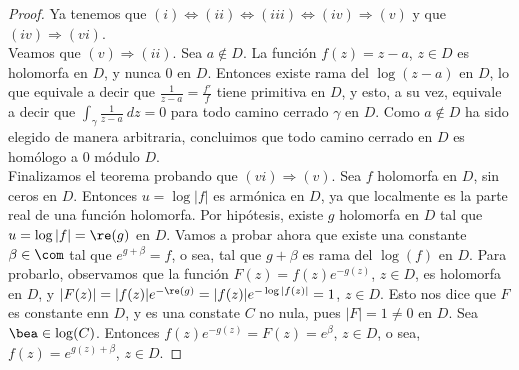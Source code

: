 \begin{proof}
Ya tenemos que $(i) \Longleftrightarrow (ii) \Longleftrightarrow (iii) \Longleftrightarrow (iv) \Longrightarrow (v)$ y que $(iv) \Longrightarrow (vi)$.
\\
\newline
 Veamos que $(v) \Longrightarrow (ii)$. Sea $a \not \in D$. La función $f(z) = z-a$, $z \in D$ es holomorfa en $D$, y nunca 0 en $D$. Entonces existe rama del $\log(z-a)$ en $D$, lo que equivale a decir que $\frac{1}{z-a} = \frac{f'}{f}$ tiene primitiva en $D$, y esto, a su vez, equivale a decir que $\int_{\gamma} \frac{1}{z-a} \ dz = 0$ para todo camino cerrado $\gamma$ en $D$. Como $a \not \in D$ ha sido elegido de manera arbitraria, concluimos que todo camino cerrado en $D$ es homólogo a 0 módulo $D$.
\\
\newline
Finalizamos el teorema probando que $(vi) \Longrightarrow (v)$. Sea $f$ holomorfa en $D$, sin ceros en $D$. Entonces $u = \log |f|$ es armónica en $D$, ya que localmente es la parte real de una función holomorfa. Por hipótesis, existe $g$ holomorfa en $D$ tal que $u = \log|f| = \re(g)$ en $D$. Vamos a probar ahora que existe una constante $\beta \in \com$ tal que $e^{g + \beta} = f$, o sea, tal que $g + \beta$ es rama del $\log(f)$ en $D$. Para probarlo, observamos que la función $F(z) = f(z)e^{-g(z)}$, $z \in D$, es holomorfa en $D$, y $|F(z)| = |f(z)|e^{-\re(g)} = |f(z)|e^{-\log|f(z)|} = 1$, $z \in D$. Esto nos dice que $F$ es constante enn $D$, y es una constate $C$ no nula, pues $|F| = 1 \not = 0$ en $D$. Sea $\bea \in \log(C)$. Entonces $f(z)e^{-g(z)} = F(z) = e^{\beta}$, $z \in D$, o sea, $f(z) = e^{g(z) +\beta}$, $z \in D$.
\end{proof}